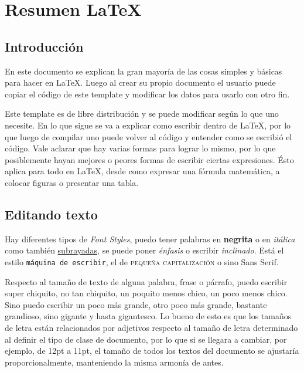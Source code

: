 \documentclass[a4paper,12pt]{article} %
\begin{document}
\thispagestyle{empty} %
\newpage              %


\tableofcontents      %
\thispagestyle{empty} %
\newpage              %

\clearpage


\section{Resumen \LaTeX}
\subsection{Introducción}
	
	En este documento se explican la gran mayoría de las cosas simples y básicas para hacer en \LaTeX. Luego al crear su propio documento el usuario puede copiar el código de este template y modificar los datos para usarlo con otro fin. 
	
	Este template es de libre distribución y se puede modificar según lo que uno necesite. En lo que sigue se va a explicar como escribir dentro de \LaTeX, por lo que luego de compilar uno puede volver al código y entender como se escribió el código. Vale aclarar que hay varias formas para lograr lo mismo, por lo que posiblemente hayan mejores o peores formas de escribir ciertas expresiones. Ésto aplica para todo en \LaTeX, desde como expresar una fórmula matemática, a colocar figuras o presentar una tabla.

\subsection{Editando texto}
	Hay diferentes tipos de \textit{Font Styles}, puedo tener palabras en \textbf{negrita} o en \textit{itálica} como también \underline{subrayadas}, se puede poner \emph{énfasis} o escribir \textsl{inclinado}. Está el estilo \texttt{máquina de escribir}, el de \textsc{pequeña capitalización} o sino \textsf{Sans Serif}.
	
	Respecto al tamaño de texto de alguna palabra, frase o párrafo, puedo escribir {\tiny super chiquito}, no tan {\scriptsize chiquito}, un poquito menos {\footnotesize chico}, un poco menos {\small chico}. Sino puedo escribir un poco más {\large grande}, otro poco más {\Large grande}, bastante {\LARGE grandioso}, sino {\huge gigante } y hasta {\Huge gigantesco}. Lo bueno de esto es que los tamaños de letra están relacionados por adjetivos respecto al tamaño de letra determinado al definir el tipo de clase de documento, por lo que si se llegara a cambiar, por ejemplo, de 12pt a 11pt, el tamaño de todos los textos del documento se ajustaría proporcionalmente, manteniendo la misma armonía de antes.
	
\end{document}
